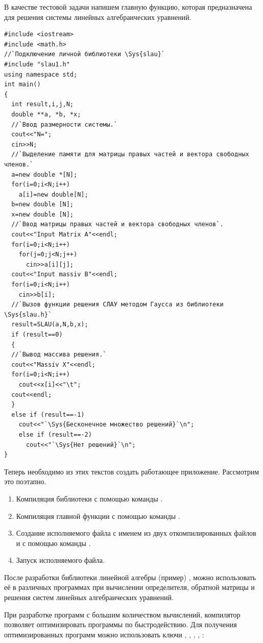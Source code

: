 В качестве тестовой задачи напишем главную функцию, которая предназначена для решения системы линейных алгебраических
уравнений.
\begin{lstlisting}
#include <iostream>
#include <math.h>
//`Подключение личной библиотеки \Sys{slau}`
#include "slau1.h"
using namespace std;
int main()
{
  int result,i,j,N;
  double **a, *b, *x; 
  //`Ввод размерности системы.`
  cout<<"N=";
  cin>>N;
  //`Выделение памяти для матрицы правых частей и вектора свободных членов.`
  a=new double *[N];
  for(i=0;i<N;i++)
    a[i]=new double[N];
  b=new double [N];
  x=new double [N];
  //`Ввод матрицы правых частей и вектора свободных членов`.
  cout<<"Input Matrix A"<<endl;
  for(i=0;i<N;i++)
    for(j=0;j<N;j++)
      cin>>a[i][j];
  cout<<"Input massiv B"<<endl;
  for(i=0;i<N;i++)
    cin>>b[i];
  //`Вызов функции решения СЛАУ методом Гаусса из библиотеки \Sys{slau.h}`
  result=SLAU(a,N,b,x);
  if (result==0)
  {
  //`Вывод массива решения.`
  cout<<"Massiv X"<<endl;
  for(i=0;i<N;i++)
    cout<<x[i]<<"\t";
  cout<<endl;
  }
  else if (result==-1)
    cout<<"`\Sys{Бесконечное множество решений}`\n";
    else if (result==-2)
      cout<<"`\Sys{Нет решений}`\n";
}
\end{lstlisting}

Теперь необходимо из этих текстов создать работающее приложение. Рассмотрим это поэтапно.

\begin{enumerate}
\item Компиляция библиотеки  с помощью команды .
\item Компиляция главной функции  с помощью команды .
\item Создание исполняемого файла с именем  из двух откомпилированных файлов  и
 с помощью команды .
\item Запуск исполняемого файла.
\end{enumerate}
После разработки библиотеки линейной алгебры (пример) , можно использовать её в различных программах при
вычислении определителя, обратной матрицы и решения систем линейных алгебраических уравнений.

При разработке программ с большим количеством вычислений, компилятор  позволяет оптимизировать программы по
быстродействию. Для получения оптимизированных программ можно использовать ключи , ,
, , :

